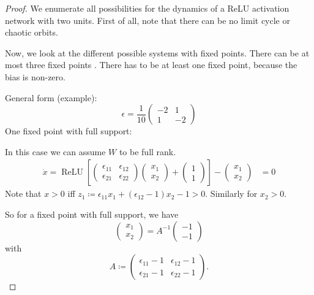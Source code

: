 \documentclass{article} %
\newcounter{ct}
\DeclareMathOperator{\relu}{ReLU}
\theoremstyle{definition}
\theoremstyle{remark}
\begin{document}
\begin{proof}
We enumerate all possibilities for the dynamics of a ReLU activation network with two units.
First of all, note that there can be no limit cycle or chaotic orbits.

Now, we look at the different possible systems with fixed points.
There can be at most three fixed points \citep[Corollary 5.3]{morrison2024diversity}.
There has to be at least one fixed point, because the bias is non-zero.

General form (example):
\begin{equation}
\epsilon = \frac{1}{10}
\begin{pmatrix}
-2  &  1 \\
 1   &  -2
\end{pmatrix}
\end{equation}
One fixed point with full support:

In this case we can assume \(W\) to be full rank.
\begin{align*}
\dot x =
\relu\left[
\begin{pmatrix}
\epsilon_{11}  &  \epsilon_{12} \\
\epsilon_{21}  &  \epsilon_{22}
\end{pmatrix}
\begin{pmatrix}
x_{1}\\x_{2}
\end{pmatrix}
+
\begin{pmatrix}
1\\1
\end{pmatrix}
\right]
-
\begin{pmatrix}
x_{1}\\x_{2}
\end{pmatrix}
&=0
\end{align*}
Note that \(x>0\) iff \(z_{1}\coloneqq \epsilon_{11}x_{1} + (\epsilon_{12}-1)x_{2} - 1>0\). Similarly for \(x_{2}>0\).

So for a fixed point with full support, we have
\begin{equation}
\begin{pmatrix}
x_{1}\\x_{2}
\end{pmatrix}
=A^{-1}
\begin{pmatrix}
-1\\-1
\end{pmatrix}
\end{equation}with
\[A\coloneqq\begin{pmatrix}
\epsilon_{11}-1  &  \epsilon_{12}-1 \\
\epsilon_{21}-1  &  \epsilon_{22}-1
\end{pmatrix}.\]



\end{proof}
\end{document}
